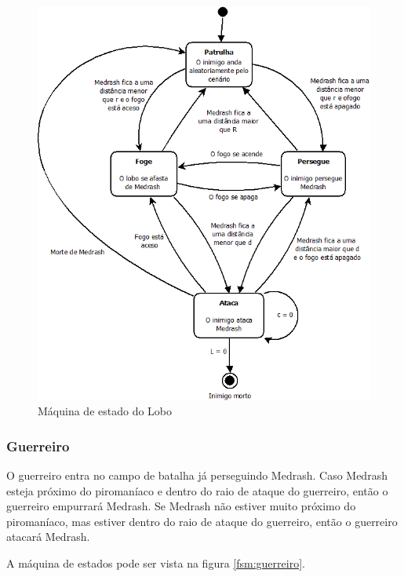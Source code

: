 \begin{figure}[!ht]
 \centering
 \includegraphics[scale=0.5]{ia_lobo.png}
 \caption{Máquina de estado do Lobo}
 \label{fsm:lobo}
\end{figure}

\subsubsection{Guerreiro}

O guerreiro entra no campo de batalha já perseguindo Medrash. Caso
Medrash esteja próximo do piromaníaco e dentro do raio de ataque do 
guerreiro, então o guerreiro empurrará Medrash.
Se Medrash não estiver muito próximo do piromaníaco, mas estiver dentro
do raio de ataque do guerreiro, então o guerreiro atacará Medrash.

A máquina de estados pode ser vista na figura \ref{fsm:guerreiro}.

